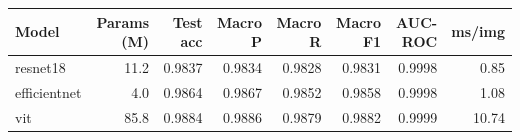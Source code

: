 \begin{tabular}{@{}lrrrrrrr@{}}
\toprule
\textbf{Model} & \textbf{Params (M)} & \textbf{Test acc} & \textbf{Macro P} & \textbf{Macro R} & \textbf{Macro F1} & \textbf{AUC-ROC} & \textbf{ms/img}\\
\midrule
resnet18 & 11.2 & 0.9837 & 0.9834 & 0.9828 & 0.9831 & 0.9998 & 0.85\\
efficientnet & 4.0 & 0.9864 & 0.9867 & 0.9852 & 0.9858 & 0.9998 & 1.08\\
vit & 85.8 & 0.9884 & 0.9886 & 0.9879 & 0.9882 & 0.9999 & 10.74\\
\bottomrule
\end{tabular}
